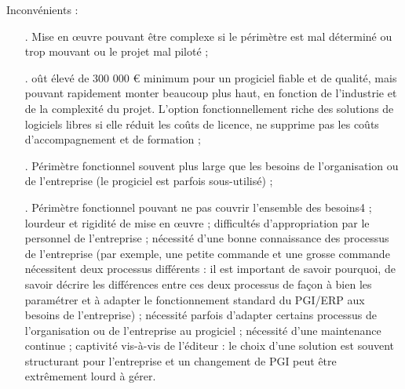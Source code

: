Inconvénients :

\begin{itemize}
\item[.]Mise en œuvre pouvant être complexe si le périmètre est mal déterminé ou trop mouvant ou le projet mal piloté ;
\item[.]oût élevé de 300 000 € minimum pour un progiciel fiable et de qualité, mais pouvant rapidement monter beaucoup plus haut, en fonction de l'industrie et de la complexité du projet. L'option fonctionnellement riche des solutions de logiciels libres si elle réduit les coûts de licence, ne supprime pas les coûts d'accompagnement et de formation ;
\item[.]Périmètre fonctionnel souvent plus large que les besoins de l'organisation ou de l'entreprise (le progiciel est parfois sous-utilisé) ;
\item[.]Périmètre fonctionnel pouvant ne pas couvrir l'ensemble des besoins4 ;
    lourdeur et rigidité de mise en œuvre ;
    difficultés d'appropriation par le personnel de l'entreprise ;
    nécessité d'une bonne connaissance des processus de l'entreprise (par exemple, une petite commande et une grosse commande nécessitent deux processus différents : il est important de savoir pourquoi, de savoir décrire les différences entre ces deux processus de façon à bien les paramétrer et à adapter le fonctionnement standard du PGI/ERP aux besoins de l'entreprise) ;
    nécessité parfois d'adapter certains processus de l'organisation ou de l'entreprise au progiciel ;
    nécessité d'une maintenance continue ;
    captivité vis-à-vis de l'éditeur : le choix d'une solution est souvent structurant pour l'entreprise et un changement de PGI peut être extrêmement lourd à gérer.


\end{itemize}
